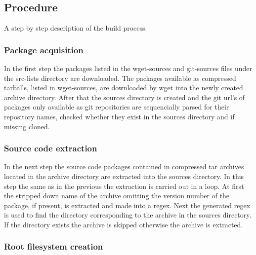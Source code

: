 \subsection{Procedure}

A step by step description of the build process.

\subsubsection{Package acquisition}

In the first step the packages listed in the wget-sources and git-sources files under the src-lists directory are downloaded. The packages available as compressed tarballs, listed in wget-sources, are downloaded by wget into the newly created archive directory. After that the sources directory is created and the git url's of packages only available as git repositories are sequencially parsed for their repository names, checked whether they exist in the sources directory and if missing cloned.


\subsubsection{Source code extraction}

In the next step the source code packages contained in compressed tar archives located in the archive directory are extracted into the sources directory. In this step the same as in the previous the extraction is carried out in a loop. At first the stripped down name of the archive omitting the version number of the package, if present, is extracted and made into a \gls{regex}. Next the generated \gls{regex} is used to find the directory corresponding to the archive in the sources directory. If the directory exists the archive is skipped otherwise the archive is extracted.


\subsubsection{Root filesystem creation}

